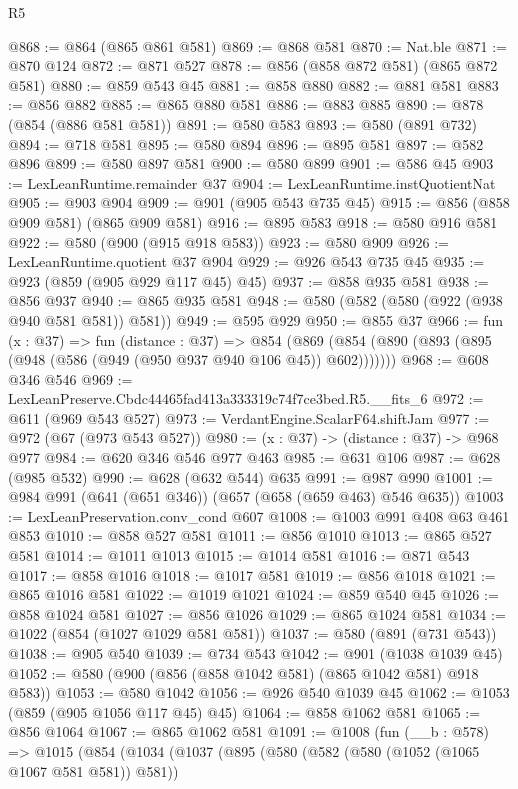 \begin{lexlean}{R5}
\begin{coremodule}
@868 := @864 (@865 @861 @581)
@869 := @868 @581
@870 := Nat.ble
@871 := @870 @124
@872 := @871 @527
@878 := @856 (@858 @872 @581) (@865 @872 @581)
@880 := @859 @543 @45
@881 := @858 @880
@882 := @881 @581
@883 := @856 @882
@885 := @865 @880 @581
@886 := @883 @885
@890 := @878 (@854 (@886 @581 @581))
@891 := @580 @583
@893 := @580 (@891 @732)
@894 := @718 @581
@895 := @580 @894
@896 := @895 @581
@897 := @582 @896
@899 := @580 @897 @581
@900 := @580 @899
@901 := @586 @45
@903 := LexLeanRuntime.remainder @37
@904 := LexLeanRuntime.instQuotientNat
@905 := @903 @904
@909 := @901 (@905 @543 @735 @45)
@915 := @856 (@858 @909 @581) (@865 @909 @581)
@916 := @895 @583
@918 := @580 @916 @581
@922 := @580 (@900 (@915 @918 @583))
@923 := @580 @909
@926 := LexLeanRuntime.quotient @37 @904
@929 := @926 @543 @735 @45
@935 := @923 (@859 (@905 @929 @117 @45) @45)
@937 := @858 @935 @581
@938 := @856 @937
@940 := @865 @935 @581
@948 := @580 (@582 (@580 (@922 (@938 @940 @581 @581)) @581))
@949 := @595 @929
@950 := @855 @37
@966 := fun (x : @37) =>
  fun (distance : @37) =>
  @854 (@869 (@854 (@890 (@893 (@895 (@948 (@586 (@949 (@950 @937 @940 @106 @45)) @602)))))))
@968 := @608 @346 @546
@969 := LexLeanPreserve.Cbdc44465fad413a333319c74f7ce3bed.R5.__fits_6
@972 := @611 (@969 @543 @527)
@973 := VerdantEngine.ScalarF64.shiftJam
@977 := @972 (@67 (@973 @543 @527))
@980 := (x : @37) -> (distance : @37) -> @968 @977
@984 := @620 @346 @546 @977 @463
@985 := @631 @106
@987 := @628 (@985 @532)
@990 := @628 (@632 @544) @635
@991 := @987 @990
@1001 := @984 @991 (@641 (@651 @346)) (@657 (@658 (@659 @463) @546 @635))
@1003 := LexLeanPreservation.conv_cond @607
@1008 := @1003 @991 @408 @63 @461 @853
@1010 := @858 @527 @581
@1011 := @856 @1010
@1013 := @865 @527 @581
@1014 := @1011 @1013
@1015 := @1014 @581
@1016 := @871 @543
@1017 := @858 @1016
@1018 := @1017 @581
@1019 := @856 @1018
@1021 := @865 @1016 @581
@1022 := @1019 @1021
@1024 := @859 @540 @45
@1026 := @858 @1024 @581
@1027 := @856 @1026
@1029 := @865 @1024 @581
@1034 := @1022 (@854 (@1027 @1029 @581 @581))
@1037 := @580 (@891 (@731 @543))
@1038 := @905 @540
@1039 := @734 @543
@1042 := @901 (@1038 @1039 @45)
@1052 := @580 (@900 (@856 (@858 @1042 @581) (@865 @1042 @581) @918 @583))
@1053 := @580 @1042
@1056 := @926 @540 @1039 @45
@1062 := @1053 (@859 (@905 @1056 @117 @45) @45)
@1064 := @858 @1062 @581
@1065 := @856 @1064
@1067 := @865 @1062 @581
@1091 := @1008
    (fun (__b : @578) =>
    @1015
      (@854
        (@1034
          (@1037
            (@895
              (@580
                (@582 (@580 (@1052 (@1065 @1067 @581 @581)) @581))

\end{coremodule}
\end{lexlean}
